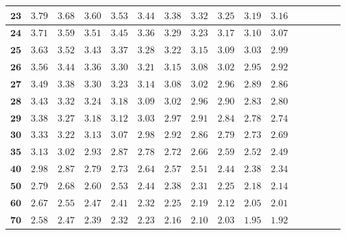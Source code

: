 \begin{customTableWrapper}{1.4}
\begin{longtable}{|r|r|r|r|r|r|r|r|r|r|r|r|r|r|r|r|}
    ${\mathbf{23}}$  & ${3.79}$    & ${3.68}$    & ${3.60}$    & ${3.53}$    & ${3.44}$    & ${3.38}$    & ${3.32}$    & ${3.25}$    & ${3.19}$    & ${3.16}$   \\ \hline 
    ${\mathbf{24}}$  & ${3.71}$    & ${3.59}$    & ${3.51}$    & ${3.45}$    & ${3.36}$    & ${3.29}$    & ${3.23}$    & ${3.17}$    & ${3.10}$    & ${3.07}$   \\ \hline 
    ${\mathbf{25}}$  & ${3.63}$    & ${3.52}$    & ${3.43}$    & ${3.37}$    & ${3.28}$    & ${3.22}$    & ${3.15}$    & ${3.09}$    & ${3.03}$    & ${2.99}$   \\ \hline 
    ${\mathbf{26}}$  & ${3.56}$    & ${3.44}$    & ${3.36}$    & ${3.30}$    & ${3.21}$    & ${3.15}$    & ${3.08}$    & ${3.02}$    & ${2.95}$    & ${2.92}$   \\ \hline 
    ${\mathbf{27}}$  & ${3.49}$    & ${3.38}$    & ${3.30}$    & ${3.23}$    & ${3.14}$    & ${3.08}$    & ${3.02}$    & ${2.96}$    & ${2.89}$    & ${2.86}$   \\ \hline 
    ${\mathbf{28}}$  & ${3.43}$    & ${3.32}$    & ${3.24}$    & ${3.18}$    & ${3.09}$    & ${3.02}$    & ${2.96}$    & ${2.90}$    & ${2.83}$    & ${2.80}$   \\ \hline 
    ${\mathbf{29}}$  & ${3.38}$    & ${3.27}$    & ${3.18}$    & ${3.12}$    & ${3.03}$    & ${2.97}$    & ${2.91}$    & ${2.84}$    & ${2.78}$    & ${2.74}$   \\ \hline 
    ${\mathbf{30}}$  & ${3.33}$    & ${3.22}$    & ${3.13}$    & ${3.07}$    & ${2.98}$    & ${2.92}$    & ${2.86}$    & ${2.79}$    & ${2.73}$    & ${2.69}$   \\ \hline 
    ${\mathbf{35}}$  & ${3.13}$    & ${3.02}$    & ${2.93}$    & ${2.87}$    & ${2.78}$    & ${2.72}$    & ${2.66}$    & ${2.59}$    & ${2.52}$    & ${2.49}$   \\ \hline 
    ${\mathbf{40}}$  & ${2.98}$    & ${2.87}$    & ${2.79}$    & ${2.73}$    & ${2.64}$    & ${2.57}$    & ${2.51}$    & ${2.44}$    & ${2.38}$    & ${2.34}$   \\ \hline 
    ${\mathbf{50}}$  & ${2.79}$    & ${2.68}$    & ${2.60}$    & ${2.53}$    & ${2.44}$    & ${2.38}$    & ${2.31}$    & ${2.25}$    & ${2.18}$    & ${2.14}$   \\ \hline 
    ${\mathbf{60}}$  & ${2.67}$    & ${2.55}$    & ${2.47}$    & ${2.41}$    & ${2.32}$    & ${2.25}$    & ${2.19}$    & ${2.12}$    & ${2.05}$    & ${2.01}$   \\ \hline 
    ${\mathbf{70}}$  & ${2.58}$    & ${2.47}$    & ${2.39}$    & ${2.32}$    & ${2.23}$    & ${2.16}$    & ${2.10}$    & ${2.03}$    & ${1.95}$    & ${1.92}$   \\ \hline 

\end{longtable}
\end{customTableWrapper}
